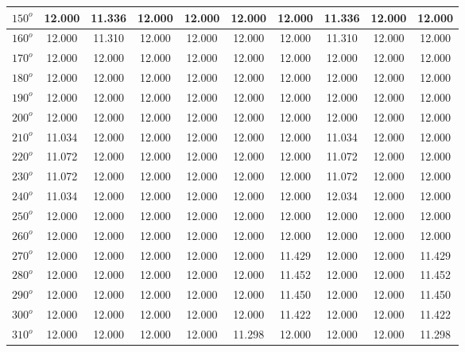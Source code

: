 \begin{table}[H]
\begin{tabular}{|c|c|c|c|c|c|c|c|c|c|}
	         \hline
	         $150^{o}$ & 12.000 & 11.336 & 12.000 & 12.000 & 12.000 & 12.000 & 11.336 & 12.000 & 12.000\\
	         \hline
	         $160^{o}$ & 12.000 & 11.310 & 12.000 & 12.000 & 12.000 & 12.000 & 11.310 & 12.000 & 12.000  \\
	         \hline
	         $170^{o}$ & 12.000 & 12.000 & 12.000 & 12.000 & 12.000 & 12.000 & 12.000& 12.000 & 12.000  \\
	         \hline
	         $180^{o}$ & 12.000 & 12.000 & 12.000 & 12.000 & 12.000 & 12.000 & 12.000& 12.000 & 12.000  \\
	         \hline
	         $190^{o}$ & 12.000 & 12.000 & 12.000 & 12.000 & 12.000 & 12.000 & 12.000& 12.000 & 12.000  \\
	         \hline
	         $200^{o}$ & 12.000 & 12.000 & 12.000 & 12.000 & 12.000 & 12.000 & 12.000& 12.000 & 12.000  \\
	         \hline
	         $210^{o}$ & 11.034 & 12.000 & 12.000 & 12.000 & 12.000 & 12.000 & 11.034 & 12.000 & 12.000  \\
	         \hline
	         $220^{o}$ & 11.072 & 12.000 & 12.000 & 12.000 & 12.000 & 12.000 & 11.072 & 12.000 & 12.000  \\
	         \hline
	         $230^{o}$ & 11.072 & 12.000 & 12.000 & 12.000 & 12.000 & 12.000 & 11.072 & 12.000 & 12.000  \\
	         \hline
	         $240^{o}$ & 11.034 & 12.000 & 12.000 & 12.000 & 12.000 & 12.000 & 12.034 & 12.000 & 12.000  \\
	         \hline
	         $250^{o}$ & 12.000 & 12.000 & 12.000 & 12.000 & 12.000 & 12.000 & 12.000& 12.000 & 12.000  \\
	         \hline
	         $260^{o}$ & 12.000 & 12.000 & 12.000 & 12.000 & 12.000 & 12.000 & 12.000& 12.000 & 12.000  \\
	         \hline
	         $270^{o}$ & 12.000 & 12.000 & 12.000 & 12.000 & 12.000 & 11.429 & 12.000& 12.000 & 11.429  \\
	         \hline
	         $280^{o}$ & 12.000 & 12.000 & 12.000 & 12.000 & 12.000 & 11.452 & 12.000& 12.000 & 11.452  \\
	         \hline
	         $290^{o}$ & 12.000 & 12.000 & 12.000 & 12.000 & 12.000 & 11.450 & 12.000& 12.000 & 11.450  \\
	         \hline
	         $300^{o}$ & 12.000 & 12.000 & 12.000 & 12.000 & 12.000 & 11.422 & 12.000& 12.000 & 11.422  \\
	         \hline
	         $310^{o}$ & 12.000 & 12.000 & 12.000 & 12.000 & 11.298 & 12.000 & 12.000& 12.000 & 11.298  \\

\end{tabular}
\end{table}
